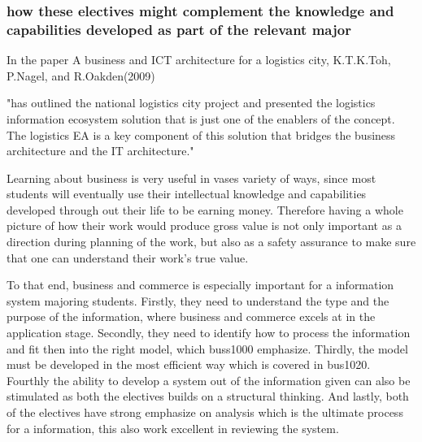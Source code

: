 \documentclass[../draft.tex]{subfiles}
\begin{document}
\subsubsection{how these electives might complement the knowledge and capabilities developed as part of the relevant major}
In the paper A business and ICT architecture for a logistics city, K.T.K.Toh, P.Nagel, and R.Oakden(2009) 
\begin{displayquote}
"has outlined the national logistics city project and presented the logistics information ecosystem solution that is just one of the enablers of the concept. The logistics EA is a key component of this solution that bridges the business architecture and the IT architecture."
\end{displayquote}
	Learning about business is very useful in vases variety of ways, since most students will eventually use their intellectual knowledge and capabilities developed through out their life to be earning money. Therefore having a whole picture of how their work would produce gross value is not only important as a direction during planning of the work, but also as a safety assurance to make sure that one can understand their work’s true value.\par
To that end, business and commerce is especially important for a information system majoring students. Firstly, they need to understand the type and the purpose of the information, where business and commerce excels at in the application stage. Secondly, they need to identify how to process the information and fit then into the right model, which buss1000 emphasize. Thirdly, the model must be developed in the most efficient way which is covered in bus1020. Fourthly the ability to develop a system out of the information given can also be stimulated as both the electives builds on a structural thinking. And lastly, both of the electives have strong emphasize on analysis which is the ultimate process for a information, this also work excellent in reviewing the system.\par
\end{document}
